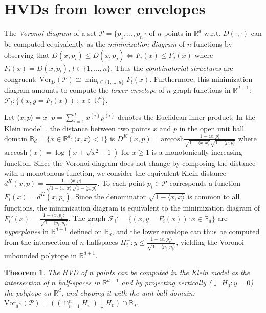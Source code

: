 \documentclass[12pt]{article}
\newtheorem{theorem}{Theorem}
\def\arccosh{\mathrm{arccosh}}
\def\st{:}
\def\calP{\mathcal{P}}
\def\bbR{\mathbb{R}}
\def\bbB{\mathbb{B}}
\def\inner#1#2{{\langle #1,#2\rangle}}
\def\Vor{\mathrm{Vor}}
\def\bbB{\mathbb{B}}
\def\calF{\mathcal{F}}
\begin{document}
\section{HVDs from lower envelopes}


The {\em Voronoi diagram} of  a set $\calP=\{p_1, ..., p_n\}$ of $n$ points  in $\mathbb{R}^d$ w.r.t. $D(\cdot,\cdot)$ can be computed equivalently as the {\em minimization diagram} of $n$ functions by observing that
$D(x,p_i)\leq D(x,p_j) \Leftrightarrow F_i(x)\leq F_j(x)$ where $F_l(x)=D(x,p_l)$, $l\in\{1, ..., n\}$.
Thus the {\em combinatorial structures} are congruent: $\Vor_D(\calP) \cong \min_{l\in\{1, ...,n\}} F_l(x)$.
Furthermore, this minimization diagram amounts to compute the {\em lower envelope} of $n$ graph functions in $\bbR^{d+1}$:
 $\mathcal{F}_l:\{(x,y=F_l(x))\ :\ x\in \mathbb{R}^d\}$.

Let $\inner{x}{p}=x^\top p=\sum_{i=1}^d x^{(i)} p^{(i)}$ denotes the Euclidean inner product.
In the Klein model~\cite{HVDeasy-2010}, the distance between two points $x$ and $p$ in the open unit ball domain $\bbB_d=\{ x\in\bbR^d \st \inner{x}{x}<1\}$  is $D^K(x,p)=\arccosh \frac{1-\inner{x}{p}}{\sqrt{1-\inner{x}{x}}\sqrt{1-\inner{p}{p}}}$ where
$\arccosh(x)=\log(x+\sqrt{x^2-1})$ for $x\geq 1$ is a monotonically increasing function.
Since the Voronoi diagram does not change by composing the distance with a monotonous function, we consider the equivalent Klein distance $d^K(x,p)=\frac{1-\inner{x}{p}}{\sqrt{1-\inner{x}{x}}\sqrt{1-\inner{p}{p}}}$.
To each point $p_i\in\calP$ corresponds a function $F_i(x)=d^K(x,p_i)$.
Since the denominator $\sqrt{1-\inner{x}{x}}$ is common to all functions, the minimization diagram is equivalent to the minimization diagram
of $F_i'(x)=\frac{1-\inner{x}{p_i}}{\sqrt{1-\inner{p_i}{p_i}}}$.
The graph $\calF_i'=\{ (x,y=F_i(x)) : x\in\bbB_d \}$ are {\em hyperplanes} in $\mathbb{R}^{d+1}$ defined on $\bbB_d$, and the lower envelope can thus be computed from the intersection of $n$ halfspaces $H_i^-: y\leq \frac{1-\inner{x}{p_i}}{\sqrt{1-\inner{p_i}{p_i}}}$, yielding the Voronoi unbounded polytope in $\bbR^{d+1}$.

\begin{theorem}
The HVD of $n$ points can be computed in the Klein model as the intersection of $n$ half-spaces in $\bbR^{d+1}$ and by projecting vertically ($\downarrow$ $H_0: y=0$) the polytope on $\bbR^d$, and clipping it with the unit ball domain: $\Vor_{d^K}(\calP)=((\cap_{i=1}^n H_i^{-})\downarrow H_0)\cap \bbB_d$.
\end{theorem}
\end{document}
